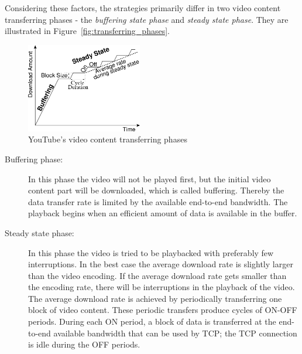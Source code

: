 Considering these factors, the strategies primarily differ in two video content transferring phases - the \emph{buffering state phase} and \emph{steady state phase}. They are illustrated in Figure~\vref{fig:transferring_phases}.\\

\begin{figure}[htbp]
  \begin{minipage}{\textwidth}
    \begin{center}
      \includegraphics[width=0.45\textwidth]{pictures/transferring_phases.png}
      \caption[YouTube's video content transferring phases]{YouTube's video content transferring phases\footnotemark[2]}
    \label{fig:transferring_phases}
    \end{center}
  \end{minipage}
\end{figure}

\setlength{\skip\footins}{0cm} %
\setlength{\skip\footins}{1cm} %

\begin{description}
  \item[Buffering phase:] In this phase the video will not be played first, but the initial video content part will be downloaded, which is called buffering. Thereby the data transfer rate is limited by the available end-to-end bandwidth. The playback begins when an efficient amount of data is available in the buffer.

  \item[Steady state phase:] In this phase the video is tried to be playbacked with preferably few interruptions. In the best case the average download rate is slightly larger than the video encoding. If the average download rate gets smaller than the encoding rate, there will be interruptions in the playback of the video. The average download rate is achieved by periodically transferring one block of video content. These periodic transfers produce cycles of ON-OFF periods. During each ON period, a block of data is transferred at the end-to-end available bandwidth that can be used by TCP; the TCP connection is idle during the OFF periods.
\end{description}

